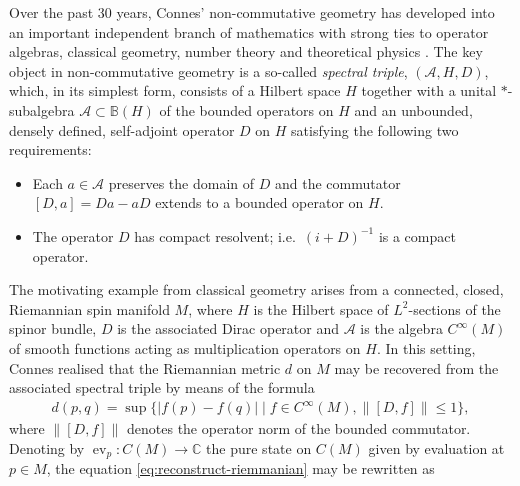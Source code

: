 \documentclass[12pt,a4paper,twoside,reqno]{amsart}
\theoremstyle{plain}
\theoremstyle{definition}
\theoremstyle{remark} %
\theoremstyle{plain}
\numberwithin{equation}{section}
\newcommand{\ev}{{\operatorname{ev}}}
\renewcommand{\leq}{\leqslant}
\newcommand{\A}{{\mathcal{A}}}
\newcommand{\BB}{{\mathbb{B}}}
\newcommand{\CC}{{\mathbb{C}}}
\begin{document}
  Over the past 30 years, Connes' non-commutative geometry  has  developed into an important independent branch of mathematics with strong ties to operator algebras, classical geometry, number theory and theoretical physics \cite{MarcCons:NCG-and-number-theory, Con:NCG,  Connes-Marcolli}. 
  The key object in non-commutative geometry is a so-called \emph{spectral triple}, $(\A, H, D)$, which, in  its simplest form,  consists of a Hilbert space $H$ together with a unital $*$-subalgebra $\A\subset \BB(H)$ of the bounded operators on $H$ and an unbounded, densely defined, self-adjoint operator $D$ on $H$ satisfying the following two requirements:
 \begin{itemize}
\item[(i)] Each $a\in \A$ preserves the domain of $D$ and the commutator $[D,a]=Da-aD$ extends to a bounded operator on $H$.
\item[(ii)] The operator $D$ has compact resolvent; i.e.~$(i+D)^{-1}$ is a compact operator.
\end{itemize}
The motivating example from classical geometry arises from a connected, closed,  Riemannian spin  manifold $M$, where $H$ is the Hilbert space of $L^2$-sections of the spinor bundle, $D$ is the associated Dirac operator and $\A$ is the algebra $C^\infty(M)$ of smooth functions  acting as multiplication operators on $H$. In this setting, Connes realised  \cite[Proposition 1]{Con:CFH} that the Riemannian metric $d$ on $M$ may be recovered from the associated spectral triple  by means of the formula
\begin{align}\label{eq:reconstruct-riemmanian}
d(p,q)=\sup\big\{ |f(p)-f(q)| \mid f\in C^\infty(M),  \|[D,f]\| \leq 1  \big\},
\end{align}
where  $\|[D,f]\|$ denotes the operator norm of the bounded commutator.  Denoting by $\ev_p\colon C(M)\to \CC$ the pure state on $C(M)$ given by evaluation at $p\in M$, the equation \eqref{eq:reconstruct-riemmanian} may be rewritten as
\end{document}
